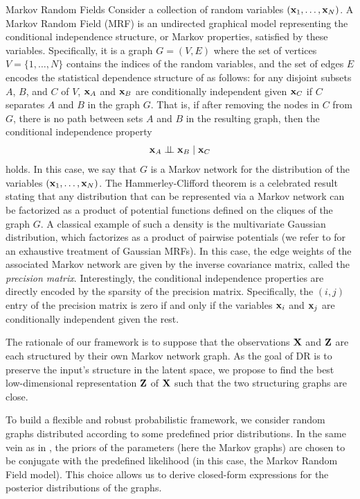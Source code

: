\begin{mem1}{Markov Random Fields}\label{memo:MRFs}
    Consider a collection of random variables $({\mathbf{x}}_1, \dots, {\mathbf{x}}_N)$. A Markov Random Field (MRF) is an undirected graphical model representing the conditional independence structure, or Markov properties, satisfied by these variables. Specifically, it is a graph $G = (V, E)$ where the set of vertices $V = \{1, \dots, N\}$ contains the indices of the random variables, and the set of edges $E$ encodes the statistical dependence structure of as follows: for any disjoint subsets $A$, $B$, and $C$ of $V$, ${\mathbf{x}}_A$ and ${\mathbf{x}}_B$ are conditionally independent given ${\mathbf{x}}_C$ if $C$ separates $A$ and $B$ in the graph $G$. That is, if after removing the nodes in $C$ from $G$, there is no path between sets $A$ and $B$ in the resulting graph, then the conditional independence property 
    \begin{align}
        {\mathbf{x}}_A \perp\!\!\!\perp {\mathbf{x}}_B \mid {\mathbf{x}}_C 
    \end{align}
    holds. In this case, we say that $G$ is a Markov network for the distribution of the variables $({\mathbf{x}}_1, \dots, {\mathbf{x}}_N)$. The Hammerley-Clifford theorem \cite{clifford1990markov} is a celebrated result stating that any distribution that can be represented via a Markov network can be factorized as a product of potential functions defined on the cliques of the graph $G$. A classical example of such a density is the multivariate Gaussian distribution, which factorizes as a product of pairwise potentials (we refer to \cite{rue2005gaussian} for an exhaustive treatment of Gaussian MRFs). In this case, the edge weights of the associated Markov network are given by the inverse covariance matrix, called the \emph{precision matrix}. Interestingly, the conditional independence properties are directly encoded by the sparsity of the precision matrix. Specifically, the $(i, j)$ entry of the precision matrix is zero if and only if the variables ${\mathbf{x}}_i$ and ${\mathbf{x}}_j$ are conditionally independent given the rest.
\end{mem1}

The rationale of our framework is to suppose that the observations $\mathbf{X}$ and $\mathbf{Z}$ are each structured by their own Markov network graph.
As the goal of DR is to preserve the input's structure in the latent space, we propose to find the best low-dimensional representation $\mathbf{Z}$ of $\mathbf{X}$ such that the two structuring graphs are close. 

To build a flexible and robust probabilistic framework, we consider random graphs distributed according to some predefined prior distributions. In the same vein as in , the priors of the parameters (here the Markov graphs) are chosen to be conjugate with the predefined likelihood (in this case, the Markov Random Field model). This choice allows us to derive closed-form expressions for the posterior distributions of the graphs.

